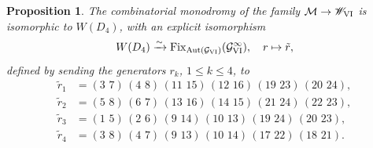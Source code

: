 \documentclass[a4paper,reqno]{amsart}
\numberwithin{equation}{section}
\newtheorem{proposition}[theorem]{Proposition}
\numberwithin{equation}{section}
\begin{document}

\begin{proposition} \label{prop:combinatorialmonodromyPVI}
The combinatorial monodromy of the family $\mathcal{M}\to\mathscr{W}_{\rm{VI}}$ is isomorphic to $W(D_4)$, with an explicit isomorphism 
    \begin{equation*}
     W(D_4)\xrightarrow{\sim}   \operatorname{Fix}_{\operatorname{Aut}(\mathcal{G}_{\rm{VI}})}(\mathcal{G}_{\rm{VI}}^\infty), \quad r\mapsto \tilde{r},
    \end{equation*}
defined by sending the generators $r_k$, $1\leq k\leq 4$, to
\begin{align*}
	\tilde{r}_1&=(3\,\, 7)\,(4\, \, 8)\,(11\,\, 15)\,(12\,\, 16)\,(19\,\, 23)\,(20\,\, 24),\\
	\tilde{r}_2&=(5\,\, 8)\,(6\, \, 7)\,(13\,\, 16)\,(14\,\, 15)\,(21\,\, 24)\,(22\,\, 23),\\
	\tilde{r}_3&=(1\,\, 5)\,(2\, \, 6)\,(9\,\, 14)\,(10\,\, 13)\,(19\,\, 24)\,(20\,\, 23),\\
	\tilde{r}_4&=(3\,\, 8)\,(4\, \, 7)\,(9\,\, 13)\,(10\,\, 14)\,(17\,\, 22)\,(18\,\, 21).
\end{align*}
\end{proposition}
\end{document}

